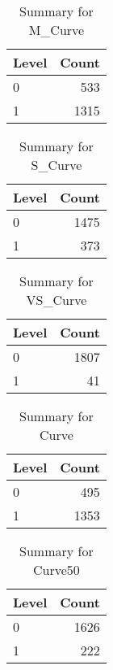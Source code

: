 \begin{table}[ht]
\centering
\begin{tabular}{lr}
  \hline
Level & Count \\ 
  \hline
0 & 533 \\ 
  1 & 1315 \\ 
   \hline
\end{tabular}
\caption{Summary for M_Curve} 
\label{tab: M_Curve}
\end{table}
\begin{table}[ht]
\centering
\begin{tabular}{lr}
  \hline
Level & Count \\ 
  \hline
0 & 1475 \\ 
  1 & 373 \\ 
   \hline
\end{tabular}
\caption{Summary for S_Curve} 
\label{tab: S_Curve}
\end{table}
\begin{table}[ht]
\centering
\begin{tabular}{lr}
  \hline
Level & Count \\ 
  \hline
0 & 1807 \\ 
  1 &  41 \\ 
   \hline
\end{tabular}
\caption{Summary for VS_Curve} 
\label{tab: VS_Curve}
\end{table}
\begin{table}[ht]
\centering
\begin{tabular}{lr}
  \hline
Level & Count \\ 
  \hline
0 & 495 \\ 
  1 & 1353 \\ 
   \hline
\end{tabular}
\caption{Summary for Curve} 
\label{tab: Curve}
\end{table}
\begin{table}[ht]
\centering
\begin{tabular}{lr}
  \hline
Level & Count \\ 
  \hline
0 & 1626 \\ 
  1 & 222 \\ 
   \hline
\end{tabular}
\caption{Summary for Curve50} 
\label{tab: Curve50}
\end{table}
